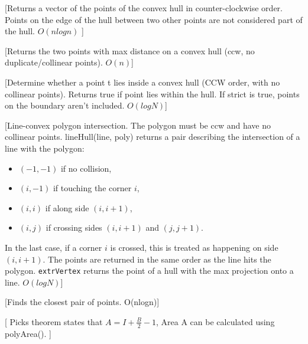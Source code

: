 

[Returns a vector of the points of the convex hull in counter-clockwise order.
Points on the edge of the hull between two other points are not considered part of the hull. $O(nlogn)$
]

[Returns the two points with max distance on a convex hull (ccw, no duplicate/collinear points). $O(n)$]

[Determine whether a point t lies inside a convex hull (CCW
 order, with no collinear points). Returns true if point lies within
 the hull. If strict is true, points on the boundary aren't included. $O(logN)$]

[Line-convex polygon intersection. The polygon must be ccw and have no collinear points.
 lineHull(line, poly) returns a pair describing the intersection of a line with the polygon:
  \begin{itemize}
    \item $(-1, -1)$ if no collision,
    \item $(i, -1)$ if touching the corner $i$,
    \item $(i, i)$ if along side $(i, i+1)$,
    \item $(i, j)$ if crossing sides $(i, i+1)$ and $(j, j+1)$.
  \end{itemize}
  In the last case, if a corner $i$ is crossed, this is treated as happening on side $(i, i+1)$.
  The points are returned in the same order as the line hits the polygon.
 \texttt{extrVertex} returns the point of a hull with the max projection onto a line. $O(logN)$]


[Finds the closest pair of points. O(nlogn)]

[
  Picks theorem states that $A = I + \frac{B}{2} - 1$, Area A can be calculated using polyArea().
]